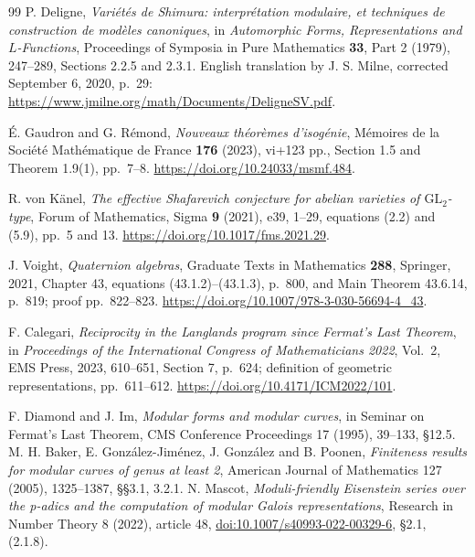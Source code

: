 \documentclass[11pt]{article}
\theoremstyle{definition}
\theoremstyle{remark}
\begin{document}
\begin{thebibliography}{99}
 P. Deligne,
\emph{Vari\'et\'es de Shimura: interpr\'etation modulaire, et techniques
de construction de mod\`eles canoniques},
in \emph{Automorphic Forms, Representations and $L$-Functions},
Proceedings of Symposia in Pure Mathematics \textbf{33}, Part 2 (1979),
247--289, Sections 2.2.5 and 2.3.1.
English translation by J. S. Milne, corrected September 6, 2020, p.~29:
\url{https://www.jmilne.org/math/Documents/DeligneSV.pdf}.

 \'E. Gaudron and G. R\'emond,
\emph{Nouveaux th\'eor\`emes d'isog\'enie},
M\'emoires de la Soci\'et\'e Math\'ematique de France \textbf{176} (2023),
vi+123 pp., Section 1.5 and Theorem 1.9(1), pp.~7--8.
\url{https://doi.org/10.24033/msmf.484}.

 R. von K\"anel,
\emph{The effective Shafarevich conjecture for abelian varieties of
$\mathrm{GL}_2$-type}, Forum of Mathematics, Sigma \textbf{9} (2021), e39,
1--29, equations (2.2) and (5.9), pp.~5 and 13.
\url{https://doi.org/10.1017/fms.2021.29}.

 J. Voight, \emph{Quaternion algebras},
Graduate Texts in Mathematics \textbf{288}, Springer, 2021,
Chapter 43, equations (43.1.2)--(43.1.3), p.~800, and
Main Theorem 43.6.14, p.~819; proof pp.~822--823.
\url{https://doi.org/10.1007/978-3-030-56694-4_43}.

 F. Calegari,
\emph{Reciprocity in the Langlands program since Fermat's Last Theorem},
in \emph{Proceedings of the International Congress of Mathematicians 2022},
Vol.~2, EMS Press, 2023, 610--651, Section 7, p.~624;
definition of geometric representations, pp.~611--612.
\url{https://doi.org/10.4171/ICM2022/101}.

 F. Diamond and J. Im,
\emph{Modular forms and modular curves}, in Seminar on Fermat's Last Theorem,
CMS Conference Proceedings 17 (1995), 39--133, \S12.5.
 M. H. Baker, E. Gonz\'alez-Jim\'enez,
J. Gonz\'alez and B. Poonen, \emph{Finiteness results for modular curves
of genus at least 2}, American Journal of Mathematics 127 (2005),
1325--1387, \S\S3.1, 3.2.1.
 N. Mascot, \emph{Moduli-friendly Eisenstein series
over the p-adics and the computation of modular Galois representations},
Research in Number Theory 8 (2022), article 48,
\href{https://doi.org/10.1007/s40993-022-00329-6}{doi:10.1007/s40993-022-00329-6},
\S2.1, (2.1.8).
\end{thebibliography}
\end{document}
